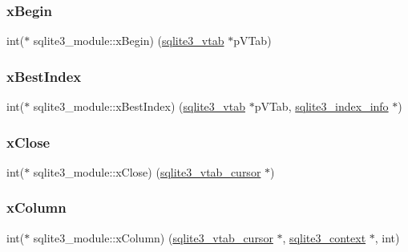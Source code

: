\mbox{\label{structsqlite3__module_af190bd5cbd1e3ff30a09ca7b015af1a1}} 
\subsubsection{\texorpdfstring{xBegin}{xBegin}}
{\footnotesize\ttfamily int($\ast$ sqlite3\+\_\+module\+::x\+Begin) (\mbox{\hyperlink{structsqlite3__vtab}{sqlite3\+\_\+vtab}} $\ast$p\+V\+Tab)}

\mbox{\label{structsqlite3__module_aad92b2cd56253baaeac656d7693ce4af}} 
\subsubsection{\texorpdfstring{xBestIndex}{xBestIndex}}
{\footnotesize\ttfamily int($\ast$ sqlite3\+\_\+module\+::x\+Best\+Index) (\mbox{\hyperlink{structsqlite3__vtab}{sqlite3\+\_\+vtab}} $\ast$p\+V\+Tab, \mbox{\hyperlink{structsqlite3__index__info}{sqlite3\+\_\+index\+\_\+info}} $\ast$)}

\mbox{\label{structsqlite3__module_acc6c4d6d41f3d056e297eea9725b887c}} 
\subsubsection{\texorpdfstring{xClose}{xClose}}
{\footnotesize\ttfamily int($\ast$ sqlite3\+\_\+module\+::x\+Close) (\mbox{\hyperlink{structsqlite3__vtab__cursor}{sqlite3\+\_\+vtab\+\_\+cursor}} $\ast$)}

\mbox{\label{structsqlite3__module_a7cde490d5d06e19b90d768b90991f4a6}} 
\subsubsection{\texorpdfstring{xColumn}{xColumn}}
{\footnotesize\ttfamily int($\ast$ sqlite3\+\_\+module\+::x\+Column) (\mbox{\hyperlink{structsqlite3__vtab__cursor}{sqlite3\+\_\+vtab\+\_\+cursor}} $\ast$, \mbox{\hyperlink{sqlite3_8h_a3b519553ffec8fc42b2356f5b1ebdc57}{sqlite3\+\_\+context}} $\ast$, int)}

